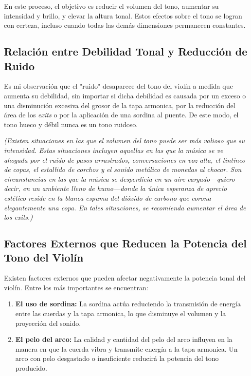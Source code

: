 \documentclass[12pt]{book}
\begin{document}
En este proceso, el objetivo es reducir el volumen del tono, aumentar su intensidad y brillo, y elevar la altura tonal. Estos efectos sobre el tono se logran con certeza, incluso cuando todas las demás dimensiones permanecen constantes.

\subsection*{Relación entre Debilidad Tonal y Reducción de Ruido}

Es mi observación que el "ruido" desaparece del tono del violín a medida que aumenta su debilidad, sin importar si dicha debilidad es causada por un exceso o una disminución excesiva del grosor de la tapa armonica, por la reducción del área de los \textit{exits} o por la aplicación de una sordina al puente. De este modo, el tono hueco y débil nunca es un tono ruidoso.

\textit{(Existen situaciones en las que el volumen del tono puede ser más valioso que su intensidad. Estas situaciones incluyen aquellas en las que la música se ve ahogada por el ruido de pasos arrastrados, conversaciones en voz alta, el tintineo de copas, el estallido de corchos y el sonido metálico de monedas al chocar. Son circunstancias en las que la música se desperdicia en un aire cargado—quiero decir, en un ambiente lleno de humo—donde la única esperanza de aprecio estético reside en la blanca espuma del dióxido de carbono que corona elegantemente una copa. En tales situaciones, se recomienda aumentar el área de los \textit{exits}.)}

\subsection*{Factores Externos que Reducen la Potencia del Tono del Violín}

Existen factores externos que pueden afectar negativamente la potencia tonal del violín. Entre los más importantes se encuentran:

\begin{enumerate}
    \item \textbf{El uso de sordina:} La sordina actúa reduciendo la transmisión de energía entre las cuerdas y la tapa armonica, lo que disminuye el volumen y la proyección del sonido.
    
    \item \textbf{El pelo del arco:} La calidad y cantidad del pelo del arco influyen en la manera en que la cuerda vibra y transmite energía a la tapa armonica. Un arco con pelo desgastado o insuficiente reducirá la potencia del tono producido.
\end{enumerate}
\end{document}
